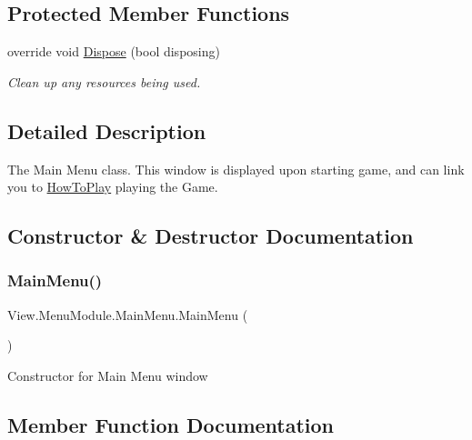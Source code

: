 \subsection*{Protected Member Functions}
\begin{DoxyCompactItemize}
\item 
override void \hyperlink{class_view_1_1_menu_module_1_1_main_menu_a21e64161c2d40559beb8de433d2cd24a}{Dispose} (bool disposing)
\begin{DoxyCompactList}\small\item\em Clean up any resources being used. \end{DoxyCompactList}\end{DoxyCompactItemize}


\subsection{Detailed Description}
The Main Menu class. This window is displayed upon starting game, and can link you to \hyperlink{class_view_1_1_menu_module_1_1_how_to_play}{How\+To\+Play} playing the Game. 



\subsection{Constructor \& Destructor Documentation}
\hypertarget{class_view_1_1_menu_module_1_1_main_menu_ad99d87752b73977b41c165162b40b5b2}{}\label{class_view_1_1_menu_module_1_1_main_menu_ad99d87752b73977b41c165162b40b5b2} 
\subsubsection{\texorpdfstring{Main\+Menu()}{MainMenu()}}
{\footnotesize\ttfamily View.\+Menu\+Module.\+Main\+Menu.\+Main\+Menu (\begin{DoxyParamCaption}{ }\end{DoxyParamCaption})\hspace{0.3cm}{\ttfamily [inline]}}

Constructor for Main Menu window 

\subsection{Member Function Documentation}
\hypertarget{class_view_1_1_menu_module_1_1_main_menu_a21e64161c2d40559beb8de433d2cd24a}{}\label{class_view_1_1_menu_module_1_1_main_menu_a21e64161c2d40559beb8de433d2cd24a} 
